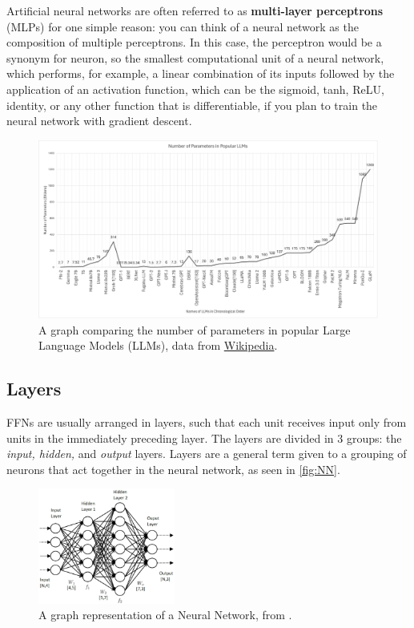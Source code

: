 \documentclass{article}
\begin{document}
   Artificial neural networks are often referred to as \textbf{multi-layer perceptrons} (MLPs) for one simple reason: you can think of a neural network as the composition of multiple perceptrons. In this case, the perceptron would be a synonym for neuron, so the smallest computational unit of a neural network, which performs, for example, a linear combination of its inputs followed by the application of an activation function, which can be the sigmoid, tanh, ReLU, identity, or any other function that is differentiable, if you plan to train the neural network with gradient descent.
 \begin{figure}
    \centering
    \includegraphics[width=1\textwidth]{parameters}
    \caption{A graph comparing the number of parameters in popular Large Language Models (LLMs), data from \href{https://en.wikipedia.org/wiki/Large_language_model}{Wikipedia}.}
    \label{fig:parameters}
  \end{figure}
\subsection{Layers}
\label{sub:Layers}
FFNs are usually arranged in layers, such that each unit receives input
only from units in the immediately preceding layer. The layers are divided in 3 groups: the \textit{input, hidden,} and \textit{output} layers. Layers are a general term given to a grouping of neurons that act together in the neural network, as seen in \autoref{fig:NN}. 
  \begin{figure} %
    \centering
    \includegraphics[width=0.4\textwidth]{NeuralNetwork}
    \caption{A graph representation of a Neural Network, from \cite{inbook:Aggarwal-1.2}.}
  \label{fig:NN}
\end{figure}
\end{document}
